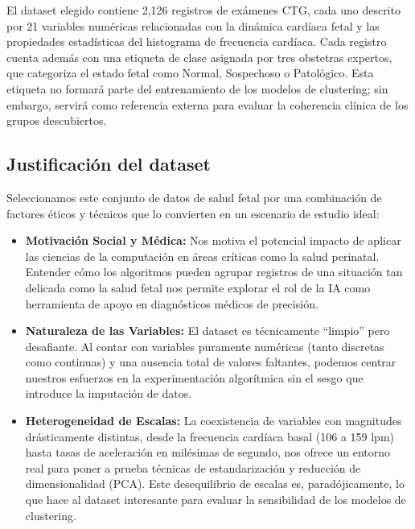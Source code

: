 \documentclass[12pt,letterpaper]{article}
\begin{document}
El dataset elegido contiene 2,126 registros de exámenes CTG, cada uno descrito por 21 variables
numéricas relacionadas con la dinámica cardíaca fetal y las propiedades estadísticas del histograma
de frecuencia cardíaca. Cada registro cuenta además con una etiqueta de clase asignada por tres
obstetras expertos, que categoriza el estado fetal como Normal, Sospechoso o Patológico. Esta
etiqueta no formará parte del entrenamiento de los modelos de clustering; sin embargo, servirá
como referencia externa para evaluar la coherencia clínica de los grupos descubiertos.

\subsection{Justificación del dataset}

Seleccionamos este conjunto de datos de salud fetal por una combinación de factores éticos y
técnicos que lo convierten en un escenario de estudio ideal:

\begin{itemize}[leftmargin=2em, itemsep=6pt]
  \item \textbf{Motivación Social y Médica:} Nos motiva el potencial impacto de aplicar las
  ciencias de la computación en áreas críticas como la salud perinatal. Entender cómo los
  algoritmos pueden agrupar registros de una situación tan delicada como la salud fetal nos
  permite explorar el rol de la IA como herramienta de apoyo en diagnósticos médicos de
  precisión.

  \item \textbf{Naturaleza de las Variables:} El dataset es técnicamente ``limpio'' pero
  desafiante. Al contar con variables puramente numéricas (tanto discretas como continuas) y una
  ausencia total de valores faltantes, podemos centrar nuestros esfuerzos en la experimentación
  algorítmica sin el sesgo que introduce la imputación de datos.

  \item \textbf{Heterogeneidad de Escalas:} La coexistencia de variables con magnitudes
  drásticamente distintas, desde la frecuencia cardíaca basal (106 a 159 lpm) hasta tasas de
  aceleración en milésimas de segundo, nos ofrece un entorno real para poner a prueba técnicas de
  estandarización y reducción de dimensionalidad (PCA). Este desequilibrio de escalas es,
  paradójicamente, lo que hace al dataset interesante para evaluar la sensibilidad de los modelos
  de clustering.
\end{itemize}
\end{document}
